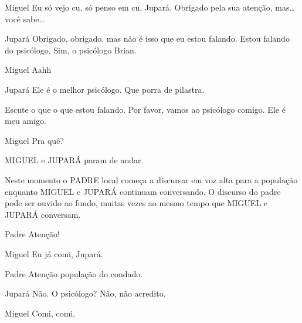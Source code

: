 \documentclass{screenplay}
\begin{document}
\begin{dialogue}{Miguel}
    Eu só vejo cu, só penso em cu, Jupará.
    Obrigado pela sua atenção, mas\dots~ você sabe\dots
\end{dialogue}

\begin{dialogue}{Jupará}
    Obrigado, obrigado, mas não é isso que eu estou falando. Estou falando do psicólogo.
    Sim, o psicólogo Brian.
\end{dialogue}

\begin{dialogue}[impaciente]{Miguel}
    Aahh
\end{dialogue}

\begin{dialogue}{Jupará}
    Ele é o melhor psicólogo.
     Que porra de pilastra.

    Escute o que o que estou falando. Por favor, vamos ao psicólogo comigo. Ele é meu amigo.
\end{dialogue}

\begin{dialogue}{Miguel}
    Pra quê?
\end{dialogue}

MIGUEL e JUPARÁ param de andar.

Neste momento o PADRE local começa a discursar em voz alta para a população enquanto MIGUEL e JUPARÁ continuam conversando. O discurso do padre pode ser ouvido ao fundo, muitas vezes ao mesmo tempo que MIGUEL e JUPARÁ conversam.

\begin{dialogue}{Padre}
    Atenção!
\end{dialogue}

\begin{dialogue}[continuando]{Miguel}
    Eu já comi, Jupará.
\end{dialogue}

\begin{dialogue}{Padre}
    Atenção população do condado.
\end{dialogue}

\begin{dialogue}{Jupará}
    Não. O psicólogo? Não, não acredito.
\end{dialogue}

\begin{dialogue}{Miguel}
    Comi, comi.
\end{dialogue}
\end{document}
